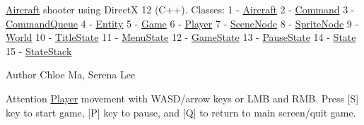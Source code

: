 \mbox{\hyperlink{class_aircraft}{Aircraft}} shooter using DirectX 12 (C++). Classes\+: 1 -\/ \mbox{\hyperlink{class_aircraft}{Aircraft}} 2 -\/ \mbox{\hyperlink{struct_command}{Command}} 3 -\/ \mbox{\hyperlink{class_command_queue}{Command\+Queue}} 4 -\/ \mbox{\hyperlink{class_entity}{Entity}} 5 -\/ \mbox{\hyperlink{class_game}{Game}} 6 -\/ \mbox{\hyperlink{class_player}{Player}} 7 -\/ \mbox{\hyperlink{class_scene_node}{Scene\+Node}} 8 -\/ \mbox{\hyperlink{class_sprite_node}{Sprite\+Node}} 9 -\/ \mbox{\hyperlink{class_world}{World}} 10 -\/ \mbox{\hyperlink{class_title_state}{Title\+State}} 11 -\/ \mbox{\hyperlink{class_menu_state}{Menu\+State}} 12 -\/ \mbox{\hyperlink{class_game_state}{Game\+State}} 13 -\/ \mbox{\hyperlink{class_pause_state}{Pause\+State}} 14 -\/ \mbox{\hyperlink{class_state}{State}} 15 -\/ \mbox{\hyperlink{class_state_stack}{State\+Stack}} \begin{DoxyAuthor}{Author}
Chloe Ma, Serena Lee 
\end{DoxyAuthor}
\begin{DoxyAttention}{Attention}
\mbox{\hyperlink{class_player}{Player}} movement with WASD/arrow keys or LMB and RMB. Press \mbox{[}S\mbox{]} key to start game, \mbox{[}P\mbox{]} key to pause, and \mbox{[}Q\mbox{]} to return to main screen/quit game. 
\end{DoxyAttention}
